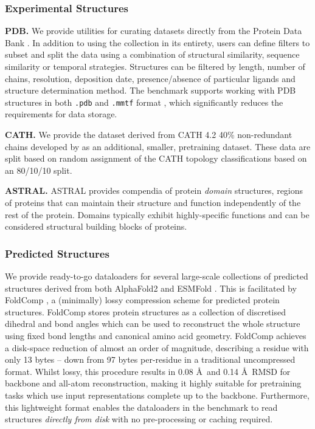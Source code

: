 \subsubsection{Experimental Structures}
\textbf{PDB. } We provide utilities for curating datasets directly from the Protein Data Bank \citep{Berman2000}. In addition to using the collection in its entirety, users can define filters to subset and split the data using a combination of structural similarity, sequence similarity or temporal strategies. Structures can be filtered by length, number of chains, resolution, deposition date, presence/absence of particular ligands and structure determination method. The benchmark supports working with PDB structures in both \texttt{.pdb} and \texttt{.mmtf} format \citep{Bradley2017}, which significantly reduces the requirements for data storage.

\textbf{CATH. } We provide the dataset derived from CATH 4.2 40\% \citep{Knudsen2010} non-redundant chains developed by \citet{NEURIPS2019_f3a4ff48} as an additional, smaller, pretraining dataset. These data are split based on random assignment of the CATH topology classifications based on an 80/10/10 split.

\textbf{ASTRAL. } ASTRAL \citep{Brenner2000} provides compendia of protein \emph{domain} structures, regions of proteins that can maintain their structure and function independently of the rest of the protein. Domains typically exhibit highly-specific functions and can be considered structural building blocks of proteins.%

\subsubsection{Predicted Structures}
We provide ready-to-go dataloaders for several large-scale collections of predicted structures derived from both AlphaFold2 \citep{jumper2021highly} and ESMFold \citep{lin2022language}. 
This is facilitated by FoldComp \citep{Kim2023}, a (minimally) lossy compression scheme for predicted protein structures. FoldComp stores protein structures as a collection of discretised dihedral and bond angles which can be used to reconstruct the whole structure using fixed bond lengths and canonical amino acid geometry. FoldComp achieves a disk-space reduction of almost an order of magnitude, describing a residue with only 13 bytes -- down from 97 bytes per-residue in a traditional uncompressed format. Whilst lossy, this procedure results in 0.08 \AA\ and 0.14 \AA\ RMSD for backbone and all-atom reconstruction, making it highly suitable for pretraining tasks which use input representations complete up to the backbone. Furthermore, this lightweight format enables the dataloaders in the benchmark to read structures \emph{directly from disk} with no pre-processing or caching required.

